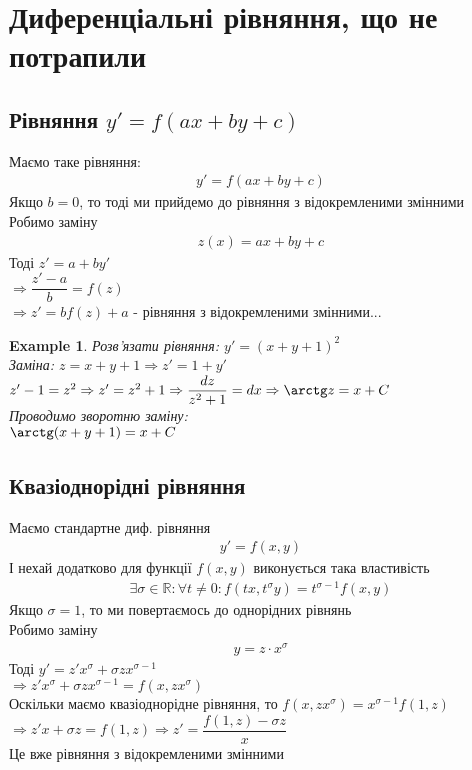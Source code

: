 \documentclass[a4paper, 10pt]{article}
\theoremstyle{theoremdd}
\theoremstyle{theoremdd}
\theoremstyle{theoremdd}
\theoremstyle{theoremdd}
\newtheorem{example}[theorem]{Example}
\theoremstyle{theoremdd}
\theoremstyle{theoremdd}
\theoremstyle{theoremdd}
\theoremstyle{theoremdd}
\begin{document}
\section{Диференціальні рівняння, що не потрапили}
\subsection{Рівняння $y' = f(ax+by+c)$}
Маємо таке рівняння:
\begin{align*}
y' = f(ax+by+c)
\end{align*}
Якщо $b = 0$, то тоді ми прийдемо до рівняння з відокремленими змінними\\
Робимо заміну
\begin{align*}
z(x) = ax + by + c
\end{align*}
Тоді $z' = a + by'$\\
$\Rightarrow \dfrac{z'-a}{b} = f(z)$\\
$\Rightarrow z' = bf(z) + a$ - рівняння з відокремленими змінними...

\begin{example}
 Розв'язати рівняння: $y' = (x+y+1)^2$\\
Заміна: $z = x+y+1 \Rightarrow z' = 1 + y'$\\
$z' - 1 = z^2 \Rightarrow z' = z^2 + 1 \Rightarrow \dfrac{dz}{z^2+1} = dx \Rightarrow \arctg z = x + C$\\
Проводимо зворотню заміну:\\
$\arctg(x+y+1) = x + C$
\end{example}

\subsection{Квазіоднорідні рівняння}
Маємо стандартне диф. рівняння
\begin{align*}
y' = f(x,y)
\end{align*}
І нехай додатково для функції $f(x,y)$ виконується така властивість
\begin{align*}
\exists \sigma \in \mathbb{R}: \forall t \neq 0: f(tx, t^\sigma y) = t^{\sigma - 1} f(x,y)
\end{align*}
Якщо $\sigma = 1$, то ми повертаємось до однорідних рівнянь\\
Робимо заміну
\begin{align*}
y = z \cdot x^\sigma
\end{align*}
Тоді $y' = z' x^\sigma + \sigma z x^{\sigma - 1}$\\
$\Rightarrow z' x^\sigma + \sigma z x^{\sigma - 1} =  f(x, zx^\sigma)$\\
Оскільки маємо квазіоднорідне рівняння, то $f(x,zx^\sigma) = x^{\sigma - 1} f(1,z)$\\
$\Rightarrow z'x + \sigma z = f(1,z) \Rightarrow z' = \dfrac{f(1,z) - \sigma z}{x}$\\
Це вже рівняння з відокремленими змінними
\end{document}
